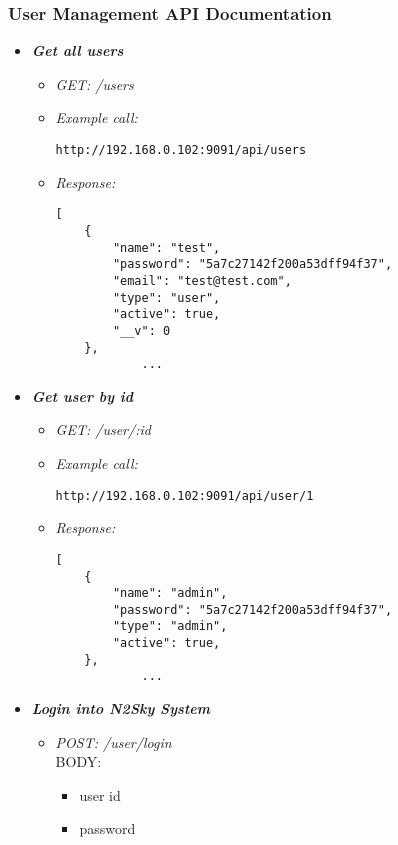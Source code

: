 \subsubsection{User Management API Documentation}\label{User Management Documentation}


\begin{itemize}
\item \textbf{\textit{Get all users}}
\begin{itemize}
\item \emph{GET: /users}
\item \emph{Example call:}
 \begin{lstlisting}
http://192.168.0.102:9091/api/users
\end{lstlisting}

\item \emph{Response:}
 \begin{lstlisting}
[
    {
        "name": "test",
        "password": "5a7c27142f200a53dff94f37",
        "email": "test@test.com",
        "type": "user",
        "active": true,
        "__v": 0
    },
            ...
\end{lstlisting}
\end{itemize}


\item \textbf{\textit{Get user by id}}
\begin{itemize}
\item \emph{GET: /user/:id}
\item \emph{Example call:}
 \begin{lstlisting}
http://192.168.0.102:9091/api/user/1
\end{lstlisting}

\item \emph{Response:}
 \begin{lstlisting}
[
    {
        "name": "admin",
        "password": "5a7c27142f200a53dff94f37",
        "type": "admin",
        "active": true,
    },
            ...
\end{lstlisting}
\end{itemize}




\item \textbf{\textit{Login into N2Sky System}}
\begin{itemize}
\item \emph{POST: /user/login}
\\BODY:
\begin{itemize}
\item user id
\item password
\end{itemize}


\end{itemize}
\end{itemize}
